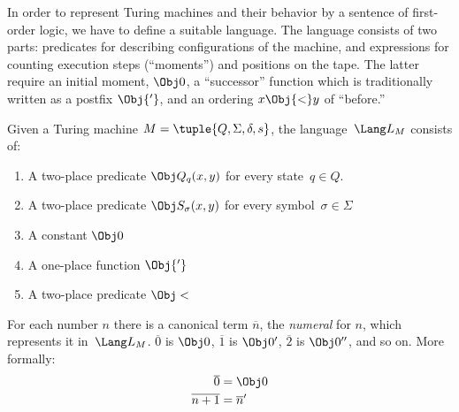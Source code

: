\documentclass[../../../include/open-logic-section]{subfiles}
\begin{document}

\begin{explain}
In order to represent Turing machines and their behavior by a sentence
of first-order logic, we have to define a suitable language. The
language consists of two parts: predicates for describing
configurations of the machine, and expressions for counting execution
steps (``moments'') and positions on the tape. The latter require an
initial moment, $\Obj 0$, a ``successor'' function which is
traditionally written as a postfix $\Obj{'}$, and an ordering $x
\Obj{<} y$ of ``before.''
\end{explain}

\begin{defn}
Given a Turing machine $M = \tuple{Q, \Sigma, \delta, s}$, the
language~$\Lang L_M$ consists of:
\begin{enumerate}
\item A two-place predicate $\Obj Q_q(x, y)$ for every state~$q \in Q$.
\item A two-place predicate $\Obj S_\sigma(x, y)$ for every
  symbol~$\sigma\in \Sigma$
\item A constant $\Obj 0$
\item A one-place function $\Obj{'}$
\item A two-place predicate $\Obj <$
\end{enumerate}
\end{defn}

For each number $n$ there is a canonical term $\overline n$, the
\emph{numeral} for $n$, which represents it in~$\Lang L_M$. $\overline
0$ is $\Obj 0$, $\overline 1$ is $\Obj 0'$, $\overline 2$ is $\Obj
0''$, and so on. More formally:
\begin{align*}
\overline 0 & = \Obj 0 \\
\overline{n+1} &= \overline{n}'
\end{align*}
\end{document}
